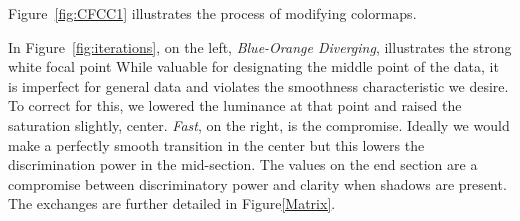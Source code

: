 \documentclass{IEEEcsmag}
\newcommand*{\colormap}[1]{\textsl{#1}\xspace}
\newcommand*{\coolwarm}{\colormap{Cool to Warm}}
\newcommand*{\blueorange}{\colormap{Blue-Orange Diverging}}
\newcommand*{\fast}{\colormap{Fast}}
\begin{document}


    



Figure~\ref{fig:CFCC1} illustrates the process of modifying colormaps.  


In Figure~\ref{fig:iterations}, on the left, \blueorange, illustrates the strong white focal point %
While valuable for designating the middle point of the data, it is imperfect for general data and violates the smoothness characteristic we desire.
To correct for this, we lowered the luminance at that point and raised the saturation slightly, center.  \fast, on the right, is the compromise. Ideally we would make a perfectly smooth transition in the center but this lowers the discrimination power in the mid-section. The values on the end section are a compromise between discriminatory power and clarity when shadows are present. The exchanges are further detailed in Figure\ref{Matrix}.



\end{document}

